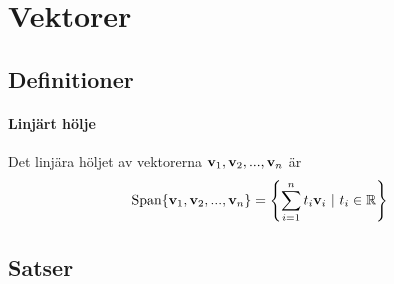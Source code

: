 \section{Vektorer}

\subsection{Definitioner}

\paragraph{Linjärt hölje}
Det linjära höljet av vektorerna $\vectorbold{v}_1, \vectorbold{v}_2, ..., \vectorbold{v}_n$ är
\begin{align*}
	\Span\{\vectorbold{v}_1, \vectorbold{v}_2, ..., \vectorbold{v}_n\} = \left\{\sum\limits_{i = 1}^{n} t_i\vectorbold{v}_i\ |\ t_i\in\R \right\}
\end{align*}

\subsection{Satser}